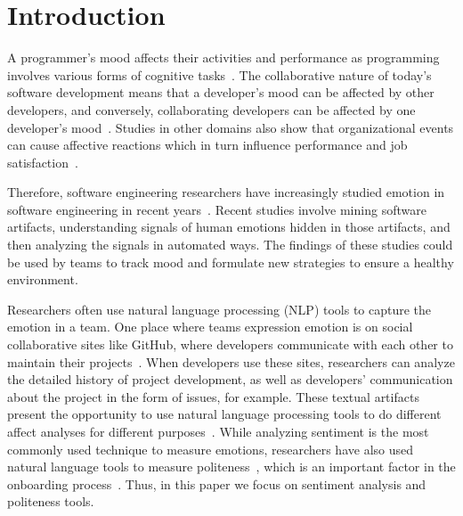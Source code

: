 \section{Introduction}

A programmer's mood affects their activities and performance as programming involves various forms of cognitive tasks~\cite{khan2011moods}. 
The collaborative nature of today's software development
means that a developer's mood can be affected by other
developers, and conversely, collaborating developers can be 
affected by one developer's 
mood~\cite{murgia2014developers,graziotin2014happy,curtis1988field}. %
Studies in other domains also show that organizational events can cause affective reactions which in turn influence performance and job satisfaction~\cite{parkinson1996changing}. 

Therefore, software engineering researchers have increasingly studied emotion in software engineering in recent years~\cite{jongeling2017negative}. 
Recent studies involve 
mining software artifacts, 
understanding signals of human emotions hidden in those artifacts, and 
then analyzing the signals in automated ways. 
The findings of these studies could be used by teams to 
track mood and formulate new strategies to ensure 
a healthy environment.

Researchers often use natural language processing (NLP) tools to capture the emotion in a team.
One place where teams expression emotion is on social collaborative sites
like GitHub, where
developers communicate with each other to maintain their projects~\cite{storey2010impact}. 
When developers use these sites, 
researchers can analyze the detailed history of project development, 
as well as developers' communication about the project in the form of issues, for example. 
These textual artifacts present the opportunity to use natural language 
processing tools to do different affect analyses for different purposes~\cite{ortu2015bullies}. 
While analyzing sentiment is the most commonly used technique to measure emotions, 
researchers have also used natural language tools to measure 
politeness~\cite{ortu2015bullies}, which is an important 
factor in the onboarding process~\cite{steinmacher2015social}.
Thus, in this paper we focus on sentiment analysis and 
politeness tools. 

